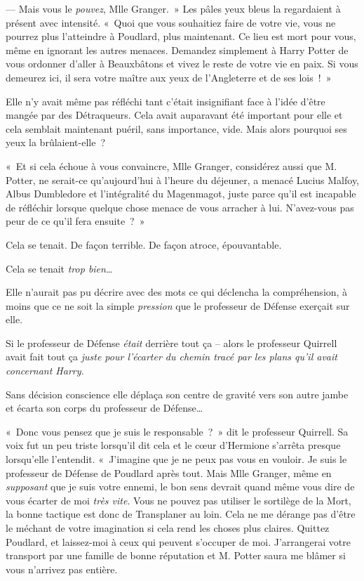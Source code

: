 --- Mais vous le \emph{pouvez}, Mlle Granger.~» Les pâles yeux bleus la regardaient à présent avec intensité. «~Quoi que vous souhaitiez faire de votre vie, vous ne pourrez plus l'atteindre à Poudlard, plus maintenant. Ce lieu est mort pour vous, même en ignorant les autres menaces. Demandez simplement à Harry Potter de vous ordonner d'aller à Beauxbâtons et vivez le reste de votre vie en paix. Si vous demeurez ici, il sera votre maître aux yeux de l'Angleterre et de ses lois~!~»

Elle n'y avait même pas réfléchi tant c'était insignifiant face à l'idée d'être mangée par des Détraqueurs. Cela avait auparavant été important pour elle et cela semblait maintenant puéril, sans importance, vide. Mais alors pourquoi ses yeux la brûlaient-elle~?

«~Et si cela échoue à vous convaincre, Mlle Granger, considérez aussi que M. Potter, ne serait-ce qu'aujourd'hui à l'heure du déjeuner, a menacé Lucius Malfoy, Albus Dumbledore et l'intégralité du Magenmagot, juste parce qu'il est incapable de réfléchir lorsque quelque chose menace de vous arracher à lui. N'avez-vous pas peur de ce qu'il fera ensuite~?~»

Cela se tenait. De façon terrible. De façon atroce, épouvantable.

Cela se tenait \emph{trop bien}…

Elle n'aurait pas pu décrire avec des mots ce qui déclencha la compréhension, à moins que ce ne soit la simple \emph{pression} que le professeur de Défense exerçait sur elle.

Si le professeur de Défense \emph{était} derrière tout ça -- alors le professeur Quirrell avait fait tout ça \emph{juste pour l'écarter du chemin tracé par les plans qu'il avait concernant Harry.}

Sans décision conscience elle déplaça son centre de gravité vers son autre jambe et écarta son corps du professeur de Défense…

«~Donc vous pensez que je suis le responsable~?~» dit le professeur Quirrell. Sa voix fut un peu triste lorsqu'il dit cela et le cœur d'Hermione s'arrêta presque lorsqu'elle l'entendit. «~J'imagine que je ne peux pas vous en vouloir. Je suis le professeur de Défense de Poudlard après tout. Mais Mlle Granger, même en \emph{supposant} que je suis votre ennemi, le bon sens devrait quand même vous dire de vous écarter de moi \emph{très vite}. Vous ne pouvez pas utiliser le sortilège de la Mort, la bonne tactique est donc de Transplaner au loin. Cela ne me dérange pas d'être le méchant de votre imagination si cela rend les choses plus claires. Quittez Poudlard, et laissez-moi à ceux qui peuvent s'occuper de moi. J'arrangerai votre transport par une famille de bonne réputation et M. Potter saura me blâmer si vous n'arrivez pas entière.


